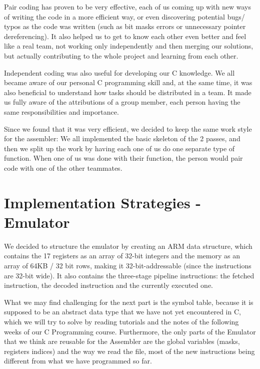 \documentclass[11pt]{article}
\begin{document}
Pair coding has proven to be very effective, each of us coming up with new ways of writing the code in a more efficient way, or even discovering potential bugs/ typos as the code was written (such as bit masks errors or unnecessary pointer dereferencing). It also helped us to get to know each other even better and feel like a real team, not working only independently and then merging our solutions, but actually contributing to the whole project and learning from each other. \\ \par \noindent
Independent coding was also useful for developing our C knowledge. We all became aware of our personal C programming skill and, at the same time, it was also beneficial to understand how tasks should be distributed in a team. It made us fully aware of the attributions of a group member, each person having the same responsibilities and importance.
\\ \par \noindent
Since we found that it was very efficient, we decided to keep the same work style for the assembler: We all implemented the basic skeleton of the 2 passes, and then we split up the work by having each one of us do one separate type of function. When one of us was done with their function, the person would pair code with one of the other teammates.

\section{Implementation Strategies - Emulator}

We decided to structure the emulator by creating an ARM data structure, which contains the 17 registers as an array of 32-bit integers and the memory as an array of 64KB / 32 bit rows, making it 32-bit-addressable (since the instructions are 32-bit wide). It also contains the three-stage pipeline instructions: the fetched instruction, the decoded instruction and the currently executed one. \\ \par \noindent
What we may find challenging for the next part is the symbol table, because it is supposed to be an abstract data type that we have not yet encountered in C, which we will try to solve by reading tutorials and the notes of the following weeks of our C Programming course. Furthermore, the only parts of the Emulator that we think are reusable for the Assembler are the global variables (masks, registers indices) and the way we read the file, most of the new instructions being different from what we have programmed so far. \\
\end{document}
